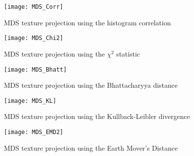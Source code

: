 \begin{figure}[!ht]
 \centering    
 \texttt{[image: MDS\_Corr]}
 \caption{MDS texture projection using the histogram correlation}
 \label{fig:MDS_Corr} 
\end{figure}

\begin{figure}[!ht]
 \centering    
 \texttt{[image: MDS\_Chi2]}
 \caption{MDS texture projection using the $\chi^2$ statistic}
 \label{fig:MDS_Chi2} 
\end{figure}

\begin{figure}[!ht]
 \centering    
 \texttt{[image: MDS\_Bhatt]}
 \caption{MDS texture projection using the Bhattacharyya distance}
 \label{fig:MDS_Bhatt} 
\end{figure}

\begin{figure}[!ht]
 \centering    
 \texttt{[image: MDS\_KL]}
 \caption{MDS texture projection using the Kullback-Leibler divergence}
 \label{fig:MDS_KL} 
\end{figure}

\begin{figure}[!ht]
 \centering    
 \texttt{[image: MDS\_EMD2]}
 \caption{MDS texture projection using the Earth Mover's Distance}
 \label{fig:MDS_EMD} 
\end{figure}